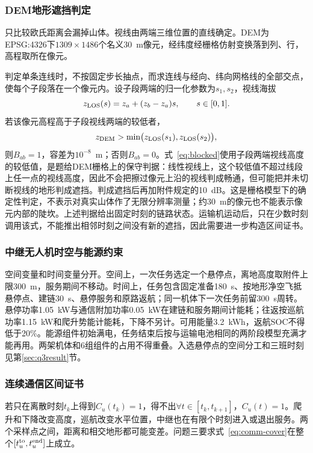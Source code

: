 \subsubsection{DEM地形遮挡判定}
\label{sec:dem}

只比较欧氏距离会漏掉山体。视线由两端三维位置的直线确定。DEM为EPSG:4326下$1309\times1486$个名义30~m像元，经纬度经栅格仿射变换落到列、行，高程取所在像元。

判定单条连线时，不按固定步长抽点，而求连线与经向、纬向网格线的全部交点，使每个子段落在一个像元内。设子段两端的归一化参数为$s_1,s_2$，视线海拔
\begin{equation}
z_{\rm LOS}(s)=z_a+(z_b-z_a)s,\qquad s\in[0,1].
\label{eq:los}
\end{equation}
若该像元高程高于子段视线两端的较低者，
\begin{equation}
z_{\rm DEM}>\min\bigl(z_{\rm LOS}(s_1),z_{\rm LOS}(s_2)\bigr),
\label{eq:blocked}
\end{equation}
则$B_{ab}=1$，容差为$10^{-8}$~m；否则$B_{ab}=0$。式~\eqref{eq:blocked}使用子段两端视线高度的较低值，是题给DEM栅格上的保守判据：线性视线上，这个较低值不超过线段上任一点的视线高度，因此不会把擦过像元上沿的视线判成畅通，但可能把并未切断视线的地形判成遮挡。判成遮挡后再加附件规定的10~dB。这是栅格模型下的确定性判定，不表示对真实山体作了无限分辨率测量；约30~m的像元也不能表示像元内部的陡坎。上述判据给出固定时刻的链路状态。运输机运动后，只在少数时刻调用该式，不能推出相邻时刻之间没有新的遮挡，因此需要进一步构造区间证书。

\subsubsection{中继无人机时空与能源约束}

空间变量和时间变量分开。空间上，一次任务选定一个悬停点，离地高度取附件上限300~m，服务期间不移动。时间上，任务包含固定准备180~s、按地形净空飞抵悬停点、建链30~s、悬停服务和原路返航；同一机体下一次任务前留300~s周转。悬停功率1.05~kW与通信附加功率0.05~kW在建链和服务期间计能耗；往返按巡航功率1.15~kW和爬升势能计能耗，下降不另计。可用能量3.2~kWh，返航SOC不得低于20\%。能源组件初始满电，任务结束后按与运输电池相同的两阶段模型充满才能再用。两架机体和6组组件的占用不得重叠。入选悬停点的空间分工和三班时刻见第\ref{sec:q3result}节。

\subsubsection{连续通信区间证书}

若只在离散时刻$t_k$上得到$C_u(t_k)=1$，得不出$\forall t\in[t_k,t_{k+1}]$，$C_u(t)=1$。爬升和下降改变高度，巡航改变水平位置，中继也在有限个时刻进入或退出服务。两个采样点之间，距离和相交地形都可能变差。问题三要求式~\eqref{eq:comm-cover}在整个$[t_u^{\rm to},t_u^{\rm end}]$上成立。


